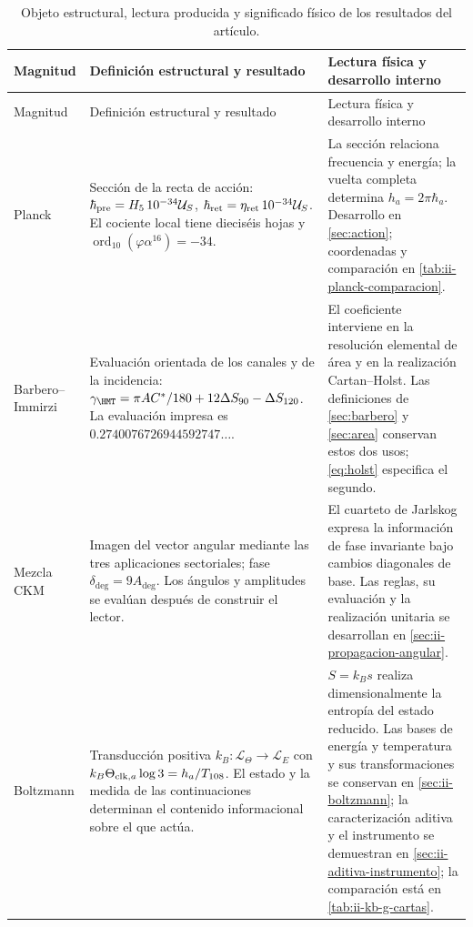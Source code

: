 \begingroup
\setlength{\LTpre}{0pt}
\setlength{\LTpost}{2pt}
\begin{longtable}{@{}p{.13\linewidth}p{.415\linewidth}p{.395\linewidth}@{}}
\caption{Objeto estructural, lectura producida y significado físico de
los resultados del artículo.}\label{tab:ii-conclusiones-estructura}\\
\toprule
Magnitud & Definición estructural y resultado & Lectura física y desarrollo interno\\
\midrule
\endfirsthead
\toprule
Magnitud & Definición estructural y resultado & Lectura física y desarrollo interno\\
\midrule
\endhead
\bottomrule
\endfoot
Planck & Sección de la recta de acción:
$\hbar_{\rm pre}=H_5\,10^{-34}\mathcal U_S$,
$\hbar_{\rm ret}=\eta_{\rm ret}\,10^{-34}\mathcal U_S$.
El cociente local tiene dieciséis hojas y
$\operatorname{ord}_{10}(\varphi\alpha^{16})=-34$.
& La sección relaciona frecuencia y energía; la vuelta completa determina
$h_a=2\pi\hbar_a$. Desarrollo en \ref{sec:action}; coordenadas y comparación
en \ref{tab:ii-planck-comparacion}.\\[5pt]
Barbero--Immirzi & Evaluación orientada de los canales y de la incidencia:
$\gamma_{\HMT}=\pi AC^*/180+12\Delta S_{90}-\Delta S_{120}$.
La evaluación impresa es $0.2740076726944592747\ldots$.
& El coeficiente interviene en la resolución elemental de área y en
la realización Cartan--Holst. Las definiciones de
\ref{sec:barbero} y \ref{sec:area} conservan estos dos usos;
\eqref{eq:holst} especifica el segundo.\\[5pt]
Mezcla CKM & Imagen del vector angular mediante las tres aplicaciones
sectoriales; fase $\delta_{\deg}=9A_{\deg}$.
Los ángulos y amplitudes se evalúan después de construir el lector.
& El cuarteto de Jarlskog expresa la información de fase invariante
bajo cambios diagonales de base. Las reglas, su evaluación y la
realización unitaria se desarrollan en
\ref{sec:ii-propagacion-angular}.\\[5pt]
Boltzmann & Transducción positiva
$k_B:\mathcal L_\Theta\to\mathcal L_E$ con
$k_B\Theta_{{\rm clk},a}\log3=h_a/T_{108}$.
El estado y la medida de las continuaciones determinan el contenido
informacional sobre el que actúa.
& $S=k_Bs$ realiza dimensionalmente la entropía del estado reducido.
Las bases de energía y temperatura y sus transformaciones se conservan
en \ref{sec:ii-boltzmann}; la caracterización aditiva y el instrumento
se demuestran en \ref{sec:ii-aditiva-instrumento}; la comparación está en
\ref{tab:ii-kb-g-cartas}.\\[5pt]

\end{longtable}
